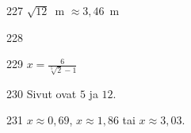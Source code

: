 \begin{Vastaus}{227}
		$\sqrt{12}$~m $\approx 3,46$~m
    
\end{Vastaus}
\begin{Vastaus}{228}
		\begin{alakohdat}
		\end{alakohdat}
    
\end{Vastaus}
\begin{Vastaus}{229}
	$x=\frac{6}{\sqrt[5]{2}-1}$
    
\end{Vastaus}
\begin{Vastaus}{230}
	Sivut ovat $5$ ja $12$.
    
\end{Vastaus}
\begin{Vastaus}{231}
	$x \approx 0,69$, $x \approx 1,86$ tai $x \approx 3,03$.
    
\end{Vastaus}
